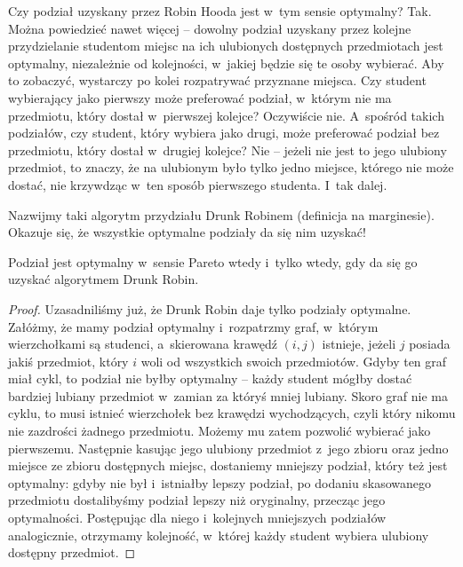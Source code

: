  Czy podział uzyskany przez Robin Hooda jest w~tym sensie optymalny? Tak. Można powiedzieć nawet więcej -- dowolny podział uzyskany przez kolejne przydzielanie studentom miejsc na ich ulubionych dostępnych przedmiotach jest optymalny, niezależnie od kolejności, w~jakiej będzie się te osoby wybierać.
Aby to zobaczyć, wystarczy po kolei rozpatrywać przyznane miejsca. Czy student  wybierający jako pierwszy może preferować podział, w~którym nie ma przedmiotu, który dostał w~pierwszej kolejce? Oczywiście nie. A~spośród takich podziałów, czy student, który wybiera jako drugi, może preferować podział bez przedmiotu, który dostał w~drugiej kolejce? Nie -- jeżeli nie jest to jego ulubiony przedmiot, to znaczy, że na ulubionym było tylko jedno miejsce, którego nie może dostać, nie krzywdząc w~ten sposób pierwszego studenta. I~tak dalej. 

Nazwijmy taki algorytm przydziału Drunk Robinem
(definicja na marginesie).
Okazuje się, że wszystkie optymalne podziały da się nim uzyskać! 

\begin{theorem*}
Podział jest optymalny w~sensie Pareto wtedy i~tylko wtedy, gdy da się go uzyskać algorytmem Drunk Robin.
\end{theorem*}
\begin{proof}
Uzasadniliśmy już, że Drunk Robin daje tylko podziały optymalne. Załóżmy, że mamy podział optymalny i~rozpatrzmy graf, w~którym wierzchołkami są studenci, a~skierowana krawędź $(i,j)$ istnieje, jeżeli $j$ posiada jakiś przedmiot, który $i$ woli od wszystkich swoich przedmiotów.
Gdyby ten graf miał cykl, to podział nie byłby optymalny -- każdy student mógłby dostać bardziej lubiany przedmiot w~zamian za któryś mniej lubiany. 
Skoro graf nie ma cyklu, to musi istnieć wierzchołek bez krawędzi wychodzących, czyli który nikomu nie zazdrości żadnego przedmiotu.
Możemy mu zatem pozwolić wybierać jako pierwszemu. Następnie kasując jego ulubiony przedmiot z~jego zbioru oraz jedno miejsce ze zbioru dostępnych miejsc, dostaniemy mniejszy podział, który też jest optymalny: gdyby nie był i~istniałby lepszy podział, po dodaniu skasowanego przedmiotu dostalibyśmy podział lepszy niż oryginalny, przecząc jego optymalności.
Postępując dla niego i~kolejnych mniejszych podziałów analogicznie, otrzymamy kolejność, w~której każdy student wybiera ulubiony dostępny przedmiot.
\end{proof}

